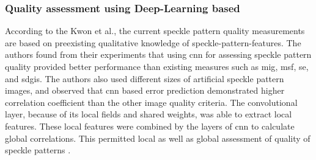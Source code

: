     \subsubsection{Quality assessment using Deep-Learning based }

        According to the Kwon et al., the current speckle pattern quality measurements are based on preexisting qualitative knowledge of speckle-pattern-features. The authors found from their experiments that using \gls{cnn} for assessing speckle pattern quality provided better performance than existing measures such as \gls{mig}, \gls{msf}, \gls{se}, and \gls{sdgis}. The authors also used different sizes of artificial speckle pattern images, and observed that \gls{cnn} based error prediction demonstrated higher correlation coefficient than the other image quality criteria. The convolutional layer, because of its local fields and shared weights, was able to extract local features. These local features were combined by the layers of \gls{cnn} to calculate global correlations. This permitted local as well as global assessment of quality of speckle patterns \cite{kwon_cnn}.
    
